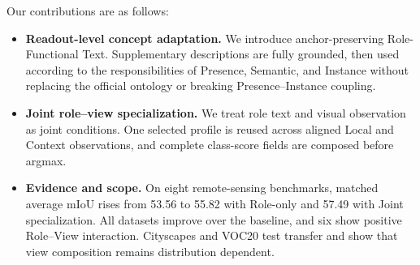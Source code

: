 Our contributions are as follows:
\begin{itemize}[leftmargin=1.2em,itemsep=1pt,topsep=2pt]
  \item \textbf{Readout-level concept adaptation.} We introduce anchor-preserving Role-Functional Text. Supplementary descriptions are fully grounded, then used according to the responsibilities of Presence, Semantic, and Instance without replacing the official ontology or breaking Presence--Instance coupling.
  \item \textbf{Joint role--view specialization.} We treat role text and visual observation as joint conditions. One selected profile is reused across aligned Local and Context observations, and complete class-score fields are composed before argmax.
  \item \textbf{Evidence and scope.} On eight remote-sensing benchmarks, matched average mIoU rises from 53.56 to 55.82 with Role-only and 57.49 with Joint specialization. All datasets improve over the baseline, and six show positive Role--View interaction. Cityscapes and VOC20 test transfer and show that view composition remains distribution dependent.
\end{itemize}
